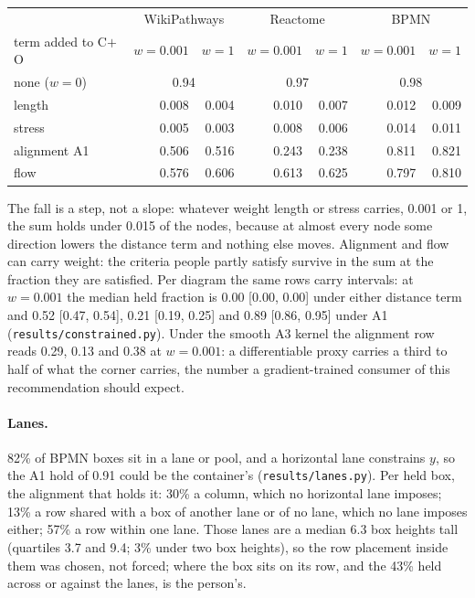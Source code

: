 \documentclass[a4paper,UKenglish]{gd-lipics-v3}
\begin{document}
\begin{center}\small
\begin{tabular}{lrrrrrr}
\toprule
 & \multicolumn{2}{c}{WikiPathways} & \multicolumn{2}{c}{Reactome} & \multicolumn{2}{c}{BPMN} \\
term added to C$+$O & $w{=}0.001$ & $w{=}1$ & $w{=}0.001$ & $w{=}1$ & $w{=}0.001$ & $w{=}1$ \\
\midrule
none ($w = 0$) & \multicolumn{2}{c}{0.94} & \multicolumn{2}{c}{0.97} & \multicolumn{2}{c}{0.98} \\
length & 0.008 & 0.004 & 0.010 & 0.007 & 0.012 & 0.009 \\
stress & 0.005 & 0.003 & 0.008 & 0.006 & 0.014 & 0.011 \\
alignment A1 & 0.506 & 0.516 & 0.243 & 0.238 & 0.811 & 0.821 \\
flow & 0.576 & 0.606 & 0.613 & 0.625 & 0.797 & 0.810 \\
\bottomrule
\end{tabular}
\end{center}

The fall is a step, not a slope: whatever weight length or stress carries, 0.001 or 1, the
sum holds under 0.015 of the nodes, because at almost every node some direction lowers the
distance term and nothing else moves. Alignment and flow can carry weight: the criteria
people partly satisfy survive in the sum at the fraction they are satisfied. Per diagram
the same rows carry intervals: at $w = 0.001$ the median held fraction is 0.00 [0.00,
0.00] under either distance term and 0.52 [0.47, 0.54], 0.21 [0.19, 0.25] and 0.89 [0.86,
0.95] under A1 (\texttt{results/constrained.py}). Under the smooth A3 kernel the
alignment row reads 0.29, 0.13 and 0.38 at $w = 0.001$: a differentiable proxy carries a
third to half of what the corner carries, the number a gradient-trained consumer of this
recommendation should expect.


\paragraph{Lanes.} 82\% of BPMN boxes sit in a lane or pool, and a horizontal lane
constrains $y$, so the A1 hold of 0.91 could be the container's
(\texttt{results/lanes.py}). Per held box, the alignment that holds it: 30\% a column,
which no horizontal lane imposes; 13\% a row shared with a box of another lane or of no
lane, which no lane imposes either; 57\% a row within one lane. Those lanes are a median
6.3 box heights tall (quartiles 3.7 and 9.4; 3\% under two box heights), so the row
placement inside them was chosen, not forced; where the box sits on its row, and the
43\% held across or against the lanes, is the person's.
\end{document}
